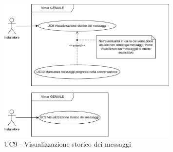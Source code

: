 \begin{figure}[H]
\centering
\includegraphics[width=0.8\textwidth]{contents/casi_duso/png/UC9.png}
\caption{UC9 - Visualizzazione storico dei messaggi}
\end{figure}

